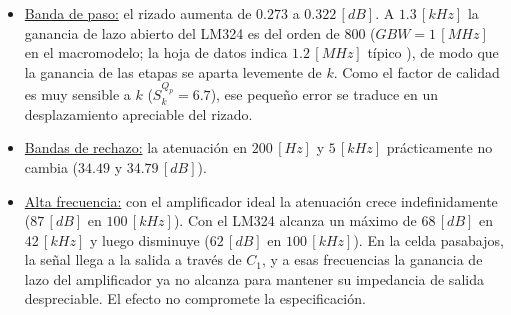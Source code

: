 \begin{itemize}
    \item \underline{Banda de paso:} el rizado aumenta de $0.273$ a $0.322 \, [dB]$. A $1.3 \, [kHz]$ la ganancia de lazo abierto del LM324 es del orden de $800$ ($GBW = 1 \, [MHz]$ en el macromodelo; la hoja de datos indica $1.2 \, [MHz]$ típico \cite[sec.~6.10]{lm324}), de modo que la ganancia de las etapas se aparta levemente de $k$. Como el factor de calidad es muy sensible a $k$ ($S_k^{Q_p} = 6.7$), ese pequeño error se traduce en un desplazamiento apreciable del rizado.
    \item \underline{Bandas de rechazo:} la atenuación en $200 \, [Hz]$ y $5 \, [kHz]$ prácticamente no cambia ($34.49$ y $34.79 \, [dB]$).
    \item \underline{Alta frecuencia:} con el amplificador ideal la atenuación crece indefinidamente ($87 \, [dB]$ en $100 \, [kHz]$). Con el LM324 alcanza un máximo de $68 \, [dB]$ en $42 \, [kHz]$ y luego disminuye ($62 \, [dB]$ en $100 \, [kHz]$). En la celda pasabajos, la señal llega a la salida a través de $C_1$, y a esas frecuencias la ganancia de lazo del amplificador ya no alcanza para mantener su impedancia de salida despreciable. El efecto no compromete la especificación.
\end{itemize}

